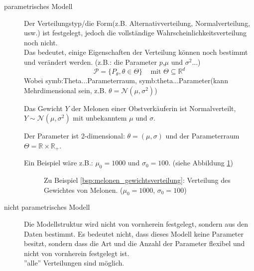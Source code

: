 \begin{description}
\item [parametrisches Modell] Der Verteilungstyp/die Form(z.B. Alternativverteilung, Normalverteilung, usw.) ist festgelegt, jedoch die vollständige Wahrscheinlichkeitsverteilung noch nicht.\\ 
Das bedeutet, einige Eigenschaften der Verteilung können noch bestimmt und verändert werden. (z.B.: die Parameter $p$,$\mu$ und $\sigma^2$...)
\[\mathcal P=\{P_\theta, \theta\in\Theta\}\;\;\;\text{ mit }\Theta\subseteq\mathbb{R}^d\]
Wobei \gls{symb:Theta}...Parameterraum, \gls{symb:theta}...Parameter(kann Mehrdimensional sein, z.B. $\theta=\mathcal N(\mu, \sigma^2)$)


{
    \def\muval{1000}%
    \def\sigmaval{100}
\begin{bsp}\label{bsp:melonen_gewichtsverteilung}
Das Gewicht $Y$ der Melonen einer Obstverkäuferin ist Normalverteilt, $Y\sim\mathcal N(\mu, \sigma^2)$ mit unbekanntem $\mu$ und $\sigma$.

Der Parameter ist 2-dimensional: $\theta=(\mu, \sigma)$ und der Parameterraum $\Theta=\mathbb{R}\times\mathbb{R}_+$.

Ein Beispiel wäre z.B.: $\mu_0=\muval$ und $\sigma_0=\sigmaval$. (siehe Abbildung \ref{fig:melonen_gewichtsverteilung})\\
\end{bsp}
\begin{figure}
    \centering
    \begin{tikzpicture}
    \end{tikzpicture}
    \caption{Zu Beispiel \ref{bsp:melonen_gewichtsverteilung}: Verteilung des Gewichtes von Melonen. ($\mu_0=\muval$, $\sigma_0=\sigmaval$)}
    \label{fig:melonen_gewichtsverteilung}
\end{figure}
}

\item [nicht parametrisches Modell] Die Modellstruktur wird nicht von vornherein festgelegt, sondern aus den Daten bestimmt. Es bedeutet nicht, dass dieses Modell keine Parameter besitzt, sondern dass die Art und die Anzahl der Parameter flexibel und nicht von vornherein festgelegt ist. \\ ''alle'' Verteilungen sind möglich.
\end{description}



